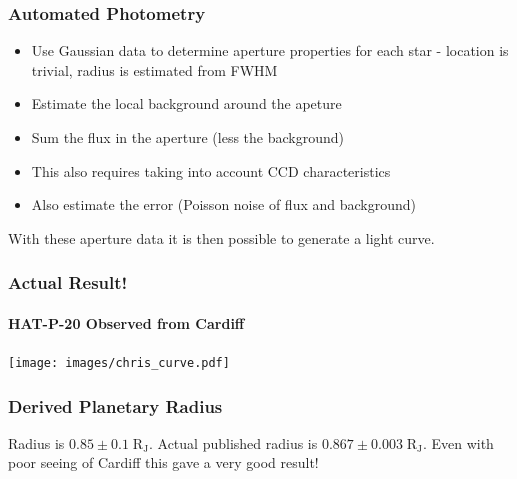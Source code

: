 \documentclass{beamer}
\providecommand{\units}[1]{\;\mathrm{#1}}
\providecommand{\RJ}{\ensuremath{\units{R_J}}}
\begin{document}
  \begin{frame}
  \frametitle{Automated Photometry}
  \begin{itemize}
  \item Use Gaussian data to determine aperture properties for each star - location is trivial, radius is estimated from FWHM
  \item Estimate the local background around the apeture
  \item Sum the flux in the aperture (less the background)
  \item This also requires taking into account CCD characteristics
  \item Also estimate the error (Poisson noise of flux and background)
  \end{itemize}
  With these aperture data it is then possible to generate a light curve.
  \end{frame}
  \begin{frame}
  \frametitle{Actual Result!}
  \framesubtitle{HAT-P-20 Observed from Cardiff}
  \begin{center}
        \texttt{[image: images/chris\_curve.pdf]}
  \end{center}
  \end{frame}
  \begin{frame}
    \frametitle{Derived Planetary Radius}
    Radius is $0.85\pm0.1\RJ$. Actual published radius is $0.867\pm0.003\RJ$. Even with poor seeing of Cardiff this gave a very good result!
  \end{frame}
\end{document}
